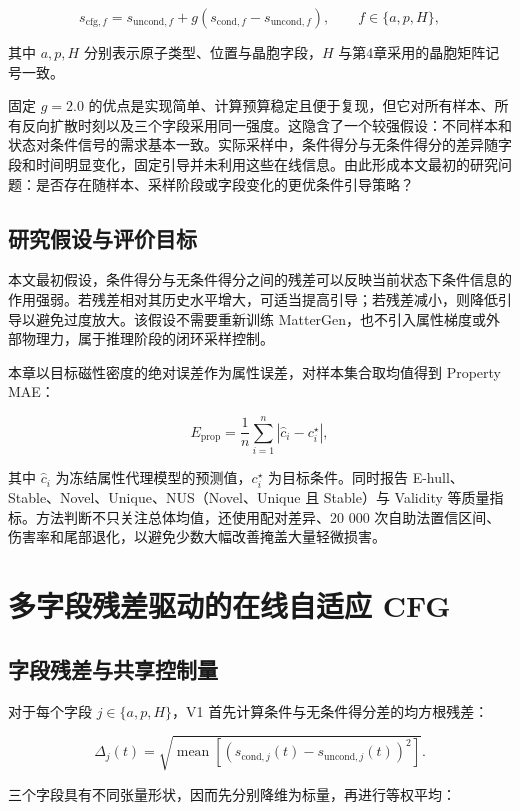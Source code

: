 \[
s_{\mathrm{cfg},f}
=s_{\mathrm{uncond},f}+g\left(s_{\mathrm{cond},f}-s_{\mathrm{uncond},f}\right),
\qquad
f\in\{a,p,H\},
\]

其中 \(a,p,H\) 分别表示原子类型、位置与晶胞字段，\(H\) 与第4章采用的晶胞矩阵记号一致。

固定 \(g=2.0\) 的优点是实现简单、计算预算稳定且便于复现，但它对所有样本、所有反向扩散时刻以及三个字段采用同一强度。这隐含了一个较强假设：不同样本和状态对条件信号的需求基本一致。实际采样中，条件得分与无条件得分的差异随字段和时间明显变化，固定引导并未利用这些在线信息。由此形成本文最初的研究问题：是否存在随样本、采样阶段或字段变化的更优条件引导策略？

\subsection{研究假设与评价目标}

本文最初假设，条件得分与无条件得分之间的残差可以反映当前状态下条件信息的作用强弱。若残差相对其历史水平增大，可适当提高引导；若残差减小，则降低引导以避免过度放大。该假设不需要重新训练 MatterGen，也不引入属性梯度或外部物理力，属于推理阶段的闭环采样控制。

本章以目标磁性密度的绝对误差作为属性误差，对样本集合取均值得到 Property MAE：

\[
E_{\mathrm{prop}}=\frac{1}{n}\sum_{i=1}^{n}
\left|\hat c_i-c_i^{\star}\right|,
\]

其中 \(\hat c_i\) 为冻结属性代理模型的预测值，\(c_i^{\star}\) 为目标条件。同时报告 E-hull、Stable、Novel、Unique、NUS（Novel、Unique 且 Stable）与 Validity 等质量指标。方法判断不只关注总体均值，还使用配对差异、20 000 次自助法置信区间、伤害率和尾部退化，以避免少数大幅改善掩盖大量轻微损害。

\section{多字段残差驱动的在线自适应 CFG}

\subsection{字段残差与共享控制量}

对于每个字段 \(j\in\{a,p,H\}\)，V1 首先计算条件与无条件得分差的均方根残差：

\[
\Delta_j(t)=
\sqrt{\operatorname{mean}\left[
\left(s_{\mathrm{cond},j}(t)-s_{\mathrm{uncond},j}(t)\right)^2
\right]}.
\]

三个字段具有不同张量形状，因而先分别降维为标量，再进行等权平均：

